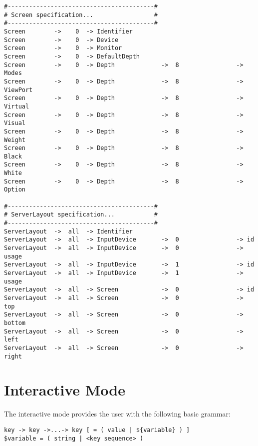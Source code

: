 \begin{verbatim}
#-----------------------------------------#
# Screen specification...                 #
#-----------------------------------------#
Screen        ->    0  -> Identifier
Screen        ->    0  -> Device
Screen        ->    0  -> Monitor
Screen        ->    0  -> DefaultDepth
Screen        ->    0  -> Depth             ->  8                -> Modes
Screen        ->    0  -> Depth             ->  8                -> ViewPort
Screen        ->    0  -> Depth             ->  8                -> Virtual
Screen        ->    0  -> Depth             ->  8                -> Visual
Screen        ->    0  -> Depth             ->  8                -> Weight
Screen        ->    0  -> Depth             ->  8                -> Black
Screen        ->    0  -> Depth             ->  8                -> White
Screen        ->    0  -> Depth             ->  8                -> Option

#-----------------------------------------#
# ServerLayout specification...           #
#-----------------------------------------#
ServerLayout  ->  all  -> Identifier
ServerLayout  ->  all  -> InputDevice       ->  0                -> id
ServerLayout  ->  all  -> InputDevice       ->  0                -> usage
ServerLayout  ->  all  -> InputDevice       ->  1                -> id
ServerLayout  ->  all  -> InputDevice       ->  1                -> usage
ServerLayout  ->  all  -> Screen            ->  0                -> id
ServerLayout  ->  all  -> Screen            ->  0                -> top
ServerLayout  ->  all  -> Screen            ->  0                -> bottom
ServerLayout  ->  all  -> Screen            ->  0                -> left
ServerLayout  ->  all  -> Screen            ->  0                -> right
\end{verbatim} 


\section{Interactive Mode}
The interactive mode provides the user with the following basic grammar:

\begin{Command}{12cm}
\begin{verbatim}
key -> key ->...-> key [ = ( value | ${variable} ) ]
$variable = ( string | <key sequence> )
\end{verbatim}
\end{Command}

